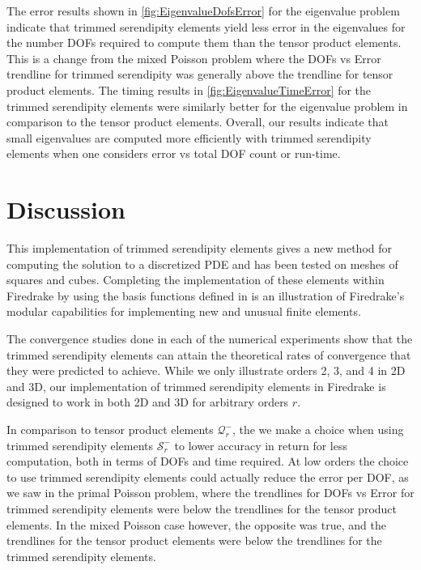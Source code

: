 \documentclass[format=acmsmall,screen,timestamp=false,a4paper]{acmart}
\begin{document}
The error results shown in \cref{fig:EigenvalueDofsError} for the eigenvalue problem indicate that trimmed serendipity elements yield less error in the eigenvalues for the number DOFs required to compute them than the tensor product elements.  This is a change from the mixed Poisson problem where the DOFs vs Error trendline for trimmed serendipity was generally above the trendline for tensor product elements.
The timing results in \cref{fig:EigenvalueTimeError} for the trimmed serendipity elements were similarly better for the eigenvalue problem in comparison to the tensor product elements. 
Overall, our results indicate that small eigenvalues are computed more efficiently with trimmed serendipity elements when one considers error vs total DOF count or run-time.


\section{Discussion}

This implementation of trimmed serendipity elements gives a new method for computing the solution to a discretized PDE and has been tested on meshes of squares and cubes.  Completing the implementation of these elements within Firedrake by using the basis functions defined in \citet{gillette2019computational} is an illustration of Firedrake's modular capabilities for implementing new and unusual finite elements. 

The convergence studies done in each of the numerical experiments show that the trimmed serendipity elements can attain the theoretical rates of convergence that they were predicted to achieve.  While we only illustrate orders 2, 3, and 4 in 2D and 3D, our implementation of trimmed serendipity elements in Firedrake is designed to work in both 2D and 3D for arbitrary orders $r$.  

In comparison to tensor product elements $\mathcal{Q}^-_r$, the we make a choice when using trimmed serendipity elements $\mathcal{S}^-_r$ to lower accuracy in return for less computation, both in terms of DOFs and time required.  At low orders the choice to use trimmed serendipity elements could actually reduce the error per DOF, as we saw in the primal Poisson problem, where the trendlines for DOFs vs Error for trimmed serendipity elements were below the trendlines for the tensor product elements.  In the mixed Poisson case however, the opposite was true, and the trendlines for the tensor product elements were below the trendlines for the trimmed serendipity elements.
\end{document}
